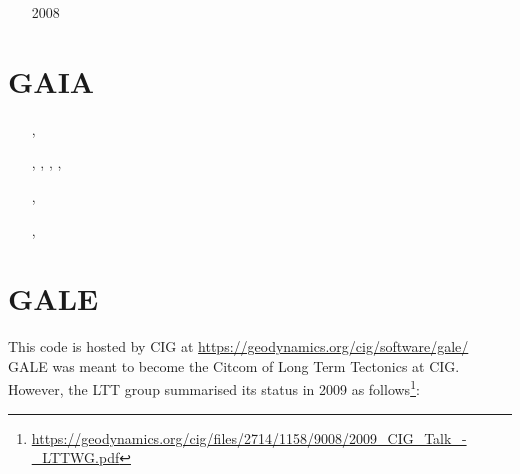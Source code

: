 \begin{small}
\begin{itemize}
\item[2008] \textcite{paln08}
\end{itemize}
\end{small}


\section{GAIA} 

\begin{small}
\begin{itemize}
\item[\twothousandeight]     \textcite{hust08b} 
\item[\twothousandeleven]    \textcite{toyu11} 
\item[\twothousandtwelve]    \textcite{nobs12}, \textcite{plsp12}
\item[\twothousandthirteen]  \textcite{hutm13}, \textcite{plth13},  \textcite{nobr13},
                             \textcite{plbs13}, \textcite{pltb13}
\item[\twothousandfifteen]   \textcite{plht15}
\item[\twothousandsixteen]   \textcite{plhm16}
\item[\twothousandseventeen] \textcite{mats17}
\item[\twothousandeighteen]  \textcite{plpt18}, \textcite{plhw18}
\item[\twothousandnineteen]  \textcite{neum19}
\item[\twothousandtwenty]    \textcite{agtb20},  \textcite{sctp20}
\end{itemize}
\end{small}


\section{GALE} 

This code is hosted by CIG at \url{https://geodynamics.org/cig/software/gale/}
GALE was meant to become the Citcom of Long Term Tectonics at CIG. However, 
the LTT group summarised its status in 2009 as 
follows\footnote{\url{https://geodynamics.org/cig/files/2714/1158/9008/2009_CIG_Talk_-_LTTWG.pdf}}:

